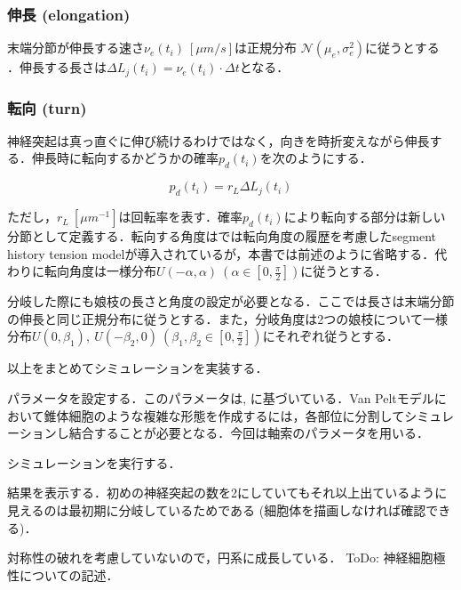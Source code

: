 \subsubsection{伸長 (elongation) }
末端分節が伸長する速さ$\nu_e(t_i)\ [\mu m/s]$は正規分布 $\mathcal{N}(\mu_e, \sigma_e^2)$に従うとする \cite{Van_Ooyen2014-fb}．伸長する長さは$\Delta L_j(t_i)=\nu_e(t_i) \cdot \Delta t$となる．

\subsubsection{転向 (turn)}
神経突起は真っ直ぐに伸び続けるわけではなく，向きを時折変えながら伸長する．伸長時に転向するかどうかの確率$p_d(t_i)$を次のようにする．


\begin{equation}
p_d(t_i) = r_L\Delta L_j(t_i)
\end{equation}


ただし，$r_L\ [\mu m^{-1}]$は回転率を表す．確率$p_d(t_i)$により転向する部分は新しい分節として定義する．転向する角度は\cite{Koene2009-hv}では転向角度の履歴を考慮したsegment history tension modelが導入されているが，本書では前述のように省略する．代わりに転向角度は一様分布$U(-\alpha, \alpha)\ \left(\alpha\in \left[0, \frac{\pi}{2}\right]\right)$に従うとする．

分岐した際にも娘枝の長さと角度の設定が必要となる．ここでは長さは末端分節の伸長と同じ正規分布に従うとする．また，分岐角度は2つの娘枝について一様分布$U(0, \beta_1),\ U(-\beta_2, 0)\ \left(\beta_1, \beta_2\in \left[0, \frac{\pi}{2}\right]\right)$にそれぞれ従うとする．

以上をまとめてシミュレーションを実装する．

パラメータを設定する．このパラメータは\cite{Koene2009-hv}, \cite{Van_Ooyen2014-fb}に基づいている．Van Peltモデルにおいて錐体細胞のような複雑な形態を作成するには，各部位に分割してシミュレーションし結合することが必要となる．今回は軸索のパラメータを用いる．

シミュレーションを実行する．

結果を表示する．初めの神経突起の数を2にしていてもそれ以上出ているように見えるのは最初期に分岐しているためである (細胞体を描画しなければ確認できる)．


対称性の破れを考慮していないので，円系に成長している．
ToDo: 神経細胞極性についての記述．
